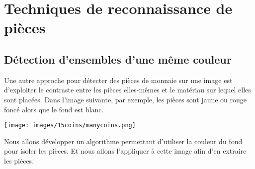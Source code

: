 \section{Techniques de reconnaissance de pièces}





\subsection{Détection d'ensembles d'une même couleur} %
Une autre approche pour détecter des pièces de monnaie sur une image est d'exploiter le contraste entre les pièces elles-mêmes et le matériau sur lequel elles sont placées. Dans l'image suivante, par exemple, les pièces sont jaune ou rouge foncé alors que le fond est blanc.

\begin{center}
\texttt{[image: images/15coins/manycoins.png]}
\end{center}

Nous allons développer un algorithme permettant d'utiliser la couleur du fond pour isoler les pièces. Et nous allons l'appliquer à cette image afin d'en extraire les pièces.
